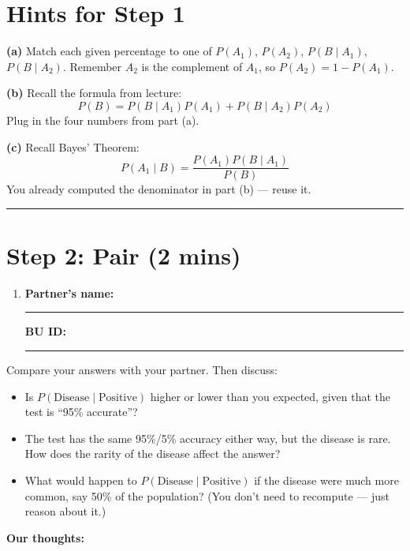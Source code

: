 \documentclass{article}
\newcommand{\nameblank}{\rule{1.75in}{0.4pt}}
\newcommand{\idblank}{\rule{1.55in}{0.4pt}}
\begin{document}
\newpage
\section*{Hints for Step 1}

\textbf{(a)} Match each given percentage to one of $P(A_1)$, $P(A_2)$, $P(B\mid A_1)$, $P(B\mid A_2)$. Remember $A_2$ is the complement of $A_1$, so $P(A_2) = 1 - P(A_1)$.

\vspace{0.2in}

\textbf{(b)} Recall the formula from lecture:
\[ P(B) = P(B\mid A_1)P(A_1) + P(B\mid A_2)P(A_2) \]
Plug in the four numbers from part (a).

\vspace{0.2in}

\textbf{(c)} Recall Bayes' Theorem:
\[ P(A_1 \mid B) = \frac{P(A_1)P(B\mid A_1)}{P(B)} \]
You already computed the denominator in part (b) --- reuse it.

\vspace{0.2in}
\noindent\rule{\linewidth}{0.4pt}
\vspace{0.2in}

\section*{Step 2: Pair (2 mins)}

\begin{enumerate}[label=\arabic*.,leftmargin=*,itemsep=.7em, start=2]
  \item \textbf{Partner's name:} \nameblank \hfill \textbf{BU ID:} \idblank
\end{enumerate}

Compare your answers with your partner. Then discuss:

\begin{itemize}
  \item Is $P(\text{Disease} \mid \text{Positive})$ higher or lower than you expected, given that the test is ``95\% accurate''?
  \item The test has the same 95\%/5\% accuracy either way, but the disease is rare. How does the rarity of the disease affect the answer?
  \item What would happen to $P(\text{Disease} \mid \text{Positive})$ if the disease were much more common, say 50\% of the population? (You don't need to recompute --- just reason about it.)
\end{itemize}

\textbf{Our thoughts:}
\vfill
\end{document}
